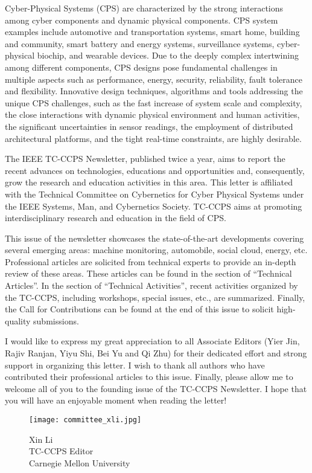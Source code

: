 
Cyber-Physical Systems (CPS) are characterized by the strong interactions among cyber components and dynamic physical components.
CPS system examples include automotive and transportation systems, smart home, building and community,
smart battery and energy systems, surveillance systems, cyber-physical biochip, and wearable devices.
Due to the deeply complex intertwining among different components, CPS designs pose fundamental challenges in multiple aspects such as performance,
energy, security, reliability, fault tolerance and flexibility.
Innovative design techniques, algorithms and tools addressing the unique CPS challenges, such as the fast increase of system scale and complexity,
the close interactions with dynamic physical environment and human activities, the significant uncertainties in sensor readings,
the employment of distributed architectural platforms, and the tight real-time constraints, are highly desirable.

The IEEE TC-CCPS Newsletter, published twice a year, aims to report the recent advances on technologies, educations and opportunities and, consequently,
grow the research and education activities in this area.
This letter is affiliated with the Technical Committee on Cybernetics for Cyber Physical Systems under the IEEE Systems, Man, and Cybernetics Society.
TC-CCPS aims at promoting interdisciplinary research and education in the field of CPS.

This issue of the newsletter showcases the state-of-the-art developments covering several emerging areas:
machine monitoring, automobile, social cloud, energy, etc.
Professional articles are solicited from technical experts to provide an in-depth review of these areas.
These articles can be found in the section of ``Technical Articles''.
In the section of ``Technical Activities'', recent activities organized by the TC-CCPS, including workshops, special issues, etc., are summarized.
Finally, the Call for Contributions can be found at the end of this issue to solicit high-quality submissions.

I would like to express my great appreciation to all Associate Editors (Yier Jin, Rajiv Ranjan, Yiyu Shi, Bei Yu and Qi Zhu) for their dedicated effort and strong support in organizing this letter.
I wish to thank all authors who have contributed their professional articles to this issue.
Finally, please allow me to welcome all of you to the founding issue of the TC-CCPS Newsletter.
I hope that you will have an enjoyable moment when reading the letter!

\vspace{.2in}
\begin{figure}[h]
\begin{minipage}{.3\textwidth}
\texttt{[image: committee\_xli.jpg]}
\caption*{Xin Li \\ TC-CCPS Editor \\ Carnegie Mellon University}
\end{minipage}
\end{figure}

